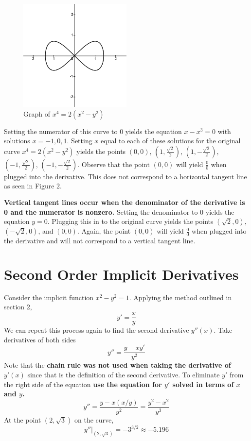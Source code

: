\documentclass[12pt, letterpaper]{article}
\begin{document}
\begin{figure}[h]
	\centering
	\includegraphics[width=0.5\textwidth]{fig2}
	\caption{Graph of $x^4 = 2(x^2-y^2)$}
\end{figure}

\noindent Setting the numerator of this curve to 0 yields the equation $x-x^3 = 0$ with solutions $x = -1, 0, 1$. Setting $x$ equal to each of these solutions for the original curve $x^4 = 2(x^2-y^2)$ yields the points $(0,0)$, $(1,\frac{\sqrt{2}}{2})$, $(1,-\frac{\sqrt{2}}{2})$, $(-1,\frac{\sqrt{2}}{2})$, $(-1,-\frac{\sqrt{2}}{2})$. Observe that the point $(0,0)$ will yield $\frac{0}{0}$ when plugged into the derivative. This does not correspond to a horizontal tangent line as seen in Figure 2.

\textbf{Vertical tangent lines occur when the denominator of the derivative is 0 and the numerator is nonzero.}  Setting the denominator to 0 yields the equation $y=0$. Plugging this in to the original curve yields the points $(\sqrt{2},0)$, $(-\sqrt{2},0)$, and $(0,0)$. Again, the point $(0,0)$ will yield $\frac{0}{0}$ when plugged into the derivative and will not correspond to a vertical tangent line.


\section{Second Order Implicit Derivatives}
Consider the implicit function $x^2-y^2 = 1$. Applying the method outlined in section 2, \[y' = \frac{x}{y}\] We can repeat this process again to find the second derivative $y''(x)$. Take derivatives of both sides \[y'' = \frac{y-xy'}{y^2}\] Note that the \textbf{chain rule was not used when taking the derivative of $y'(x)$} since that is the definition of the second derivative. To eliminate $y'$ from the right side of the equation \textbf{use the equation for $y'$ solved in terms of $x$ and $y$.} \[y'' = \frac{y-x(x/y)}{y^2} = \frac{y^2-x^2}{y^3}\] At the point $(2,\sqrt{3})$ on the curve, \[y''|_{(2,\sqrt{3})} = -3^{3/2} \approx -5.196\]
\end{document}
